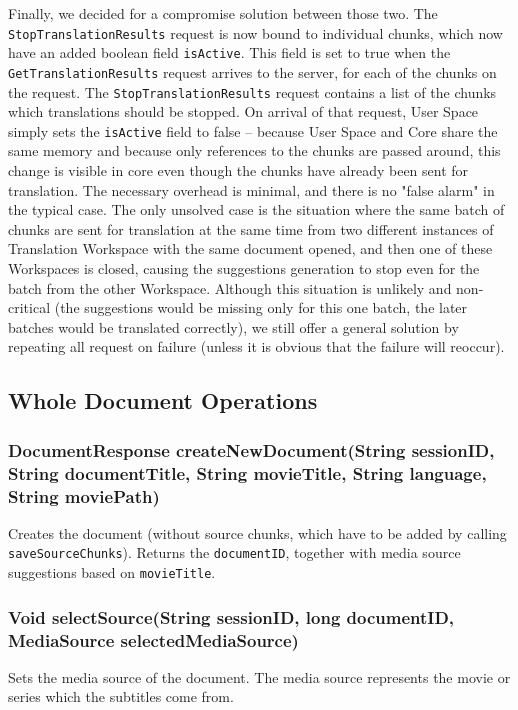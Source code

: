{Finally, we decided for a compromise solution between those two. The {\tt StopTranslationResults} request is now bound to individual chunks, which now have an added boolean field {\tt isActive}. This field is set to true when the {\tt GetTranslationResults} request arrives to the server, for each of the chunks on the request. The {\tt StopTranslationResults} request contains a list of the chunks which translations should be stopped. On arrival of that request, User Space simply sets the {\tt isActive} field to false -- because User Space and Core share the same memory and because only references to the chunks are passed around, this change is visible in core even though the chunks have already been sent for translation. The necessary overhead is minimal, and there is no "false alarm" in the typical case. The only unsolved case is the situation where the same batch of chunks are sent for translation at the same time from two different instances of Translation Workspace with the same document opened, and then one of these Workspaces is closed, causing the suggestions generation to stop even for the batch from the other Workspace. Although this situation is unlikely and non-critical (the suggestions would be missing only for this one batch, the later batches would be translated correctly), we still offer a general solution by repeating all request on failure (unless it is obvious that the failure will reoccur).

\subsection{Whole Document Operations}

\subsubsection{DocumentResponse createNewDocument(String sessionID, String documentTitle, String movieTitle, String language, String moviePath)}

Creates the document
(without source chunks, which have to be added by calling {\tt saveSourceChunks}).
Returns the {\tt documentID}, together with media source suggestions based on {\tt movieTitle}.
     	
\subsubsection{Void selectSource(String sessionID, long documentID, MediaSource selectedMediaSource)}
Sets the media source of the document. The media source represents the movie or series which the subtitles come from.

}
